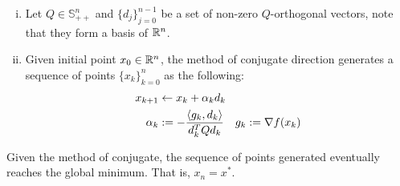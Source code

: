 \documentclass{article}
\begin{document}
	\begin{algorithm} \quad
		\begin{enumerate}[(i)]
			\item Let $Q \in \mathbb{S}_{++}^n$ and $\{d_j\}_{j=0}^{n-1}$ be a set of non-zero $Q$-orthogonal vectors, note that they form a basis of $\mathbb{R}^n$. \\
			\item Given initial point $x_0 \in \mathbb{R}^n$, the method of conjugate direction generates a sequence of points $\{x_k\}_{k=0}^n$ as the following:
			\begin{align}
				x_{k+1} &\leftarrow x_k + \alpha_k d_k \\
				\alpha_k &:= - \frac{\langle {g_k}, {d_k} \rangle}{d_k^T Q d_k} \quad g_k := \nabla f(x_k)
			\end{align}
		\end{enumerate}
	\end{algorithm}
	
	\begin{theorem}
		Given the method of conjugate, the sequence of points generated eventually reaches the global minimum. That is, $x_n = x^*$.
	\end{theorem}
	
\end{document}
